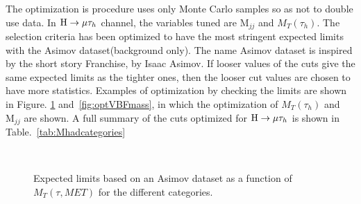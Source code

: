 The optimization is procedure uses only Monte Carlo samples so as not to double use data. In $\mathrm{H}\to \mu\tau_{h}$  channel, the variables tuned are $\textrm{M}_{jj}$ and $M_{T}(\tau_{h})$. The selection criteria has been optimized to have the most stringent expected limits with the Asimov dataset(background only). The name Asimov dataset is inspired by the short story Franchise, by Isaac Asimov. If looser values of the cuts give the same expected limits as the tighter ones, then the looser cut values are chosen to have more statistics. Examples of optimization by checking the limits are shown in Figure. \ref{fig:optMT} and~\ref{fig:optVBFmass}, in which the optimization of $M_T(\tau_{h})$  and $\textrm{M}_{jj}$ are shown. A full summary of the cuts optimized for $\mathrm{H}\to \mu\tau_{h}$ is shown in Table.~\ref{tab:Mhadcategories}


\begin{figure}[htbp] 
     \centering
     \\
     \caption{Expected limits based on an Asimov dataset as a function of $M_T(\tau, MET)$ for the different categories.}
     \label{fig:optMT}
\end{figure}

